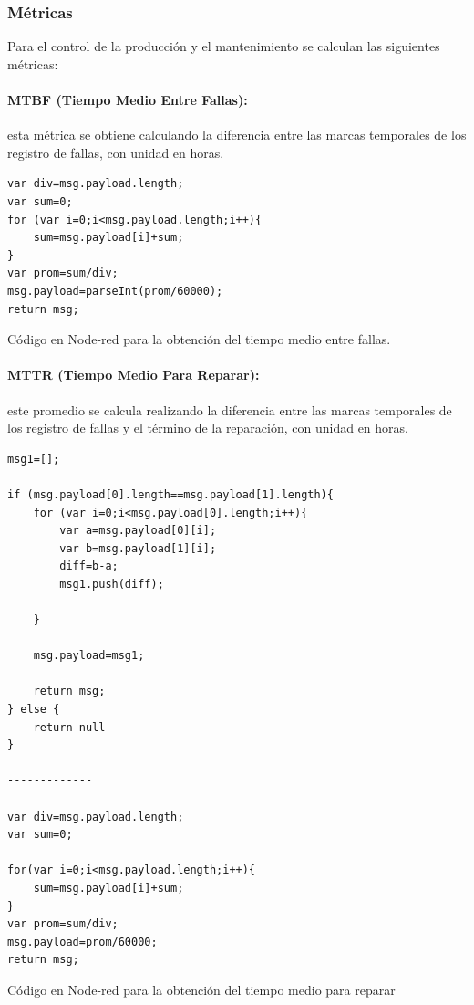 \subsubsection{Métricas}

Para el control de la producción y el mantenimiento se calculan las siguientes métricas:

\paragraph{MTBF (Tiempo Medio Entre Fallas):} esta métrica se obtiene calculando la diferencia entre las marcas temporales de los registro de fallas, con unidad en horas.

\begin{table}[H]
\begin{lstlisting}
var div=msg.payload.length;
var sum=0;
for (var i=0;i<msg.payload.length;i++){
    sum=msg.payload[i]+sum;
}
var prom=sum/div;
msg.payload=parseInt(prom/60000);
return msg;
\end{lstlisting}
\caption{Código en Node-red para la obtención del tiempo medio entre fallas.}
\end{table}

\paragraph{MTTR (Tiempo Medio Para Reparar):} este promedio se calcula realizando la diferencia entre las marcas temporales de los registro de fallas y el término de la reparación, con unidad en horas.

\begin{table}[H]
\begin{lstlisting}
msg1=[];

if (msg.payload[0].length==msg.payload[1].length){
    for (var i=0;i<msg.payload[0].length;i++){
        var a=msg.payload[0][i];
        var b=msg.payload[1][i];
        diff=b-a;
        msg1.push(diff);
    
    }
    
    msg.payload=msg1;

    return msg;    
} else {
    return null
}

-------------

var div=msg.payload.length;
var sum=0;

for(var i=0;i<msg.payload.length;i++){
    sum=msg.payload[i]+sum;
}
var prom=sum/div;
msg.payload=prom/60000;
return msg;
\end{lstlisting}
\caption{Código en Node-red para la obtención del tiempo medio para reparar}
\end{table}


